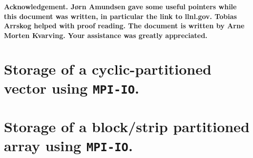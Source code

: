 \documentclass[twoside, 11pt, a4paper]{article}
\begin{document}
\bf Acknowledgement\rm. J{\o}rn Amundsen gave some useful pointers while this
document was written, in particular the link to llnl.gov. Tobias Arrskog 
helped with proof reading. The document is written by Arne Morten Kvarving.
Your assistance was greatly appreciated. 

\nocite{towards}
\nocite{mpi-io}
\nocite{mpi-io2}


\newpage
\appendix
\section{Storage of a cyclic-partitioned vector using \texttt{MPI-IO}.}
\label{app:cyclicvector}

\newpage
\section{Storage of a block/strip partitioned array using \texttt{MPI-IO}.}
\label{app:darray}

\end{document}
